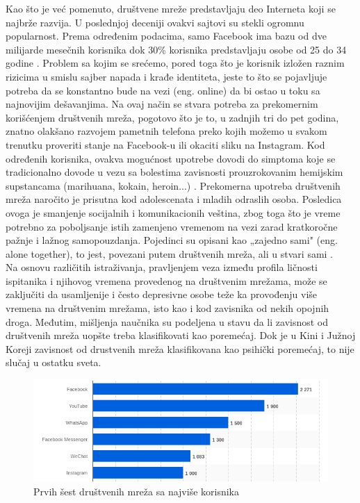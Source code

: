 \documentclass[a4paper]{article}
\begin{document}
\indent\indent Kao što je već pomenuto, društvene mreže predstavljaju deo Interneta koji se najbrže razvija. U poslednjoj deceniji ovakvi sajtovi su stekli ogromnu popularnost. Prema određenim podacima, samo Facebook ima bazu od dve milijarde mesečnih korisnika dok 30\% korisnika predstavljaju osobe od 25 do 34 godine \cite{socialN}. Problem sa kojim se srećemo, pored toga što je korisnik izložen raznim rizicima u smislu sajber napada i krađe identiteta, jeste to što se pojavljuje potreba da se konstantno bude na vezi (eng. online) da bi ostao u toku sa najnovijim dešavanjima. Na ovaj način se stvara potreba za prekomernim korišćenjem društvenih mreža, pogotovo što je to, u zadnjih tri do pet godina, znatno olakšano razvojem pametnih telefona preko kojih možemo u svakom trenutku proveriti stanje na Facebook-u ili okaciti sliku na Instagram. Kod određenih korisnika, ovakva mogućnost upotrebe dovodi do simptoma koje se tradicionalno dovode u vezu sa bolestima zavisnosti prouzrokovanim hemijskim supstancama (marihuana, kokain, heroin...)  \cite{snsa}. Prekomerna upotreba društvenih mreža naročito je prisutna kod adolescenata i mladih odraslih osoba. Posledica ovoga je smanjenje socijalnih i komunikacionih veština, zbog toga što je vreme potrebno za poboljsanje istih zamenjeno vremenom na vezi zarad kratkoročne pažnje i lažnog samopouzdanja. Pojedinci su opisani kao „zajedno sami" (eng. alone together), to jest, povezani putem društvenih mreža, ali u stvari sami \cite{turkle2017alone}.
\\
\indent Na osnovu različitih istraživanja, pravljenjem veza između profila ličnosti ispitanika i njihovog vremena provedenog na društvenim mrežama, može se zaključiti da usamljenije i često depresivne osobe teže ka provođenju više vremena na društvenim mrežama, isto kao i kod zavisnika od nekih opojnih droga. Međutim, mišljenja naučnika su podeljena u stavu da li zavisnost od društvenih mreža uopšte treba klasifikovati kao poremećaj. Dok je u Kini i Južnoj Koreji zavisnost od drustvenih mreža klasifikovana kao psihički poremećaj, to nije slučaj u ostatku sveta.
\\
\begin{figure}[h!]
\begin{center}
\includegraphics[scale=0.5]{top_6_networks.png}
\end{center}
\caption{Prvih šest društvenih mreža sa najviše korisnika}
\label{fig:top_networks}
\end{figure}
\end{document}
